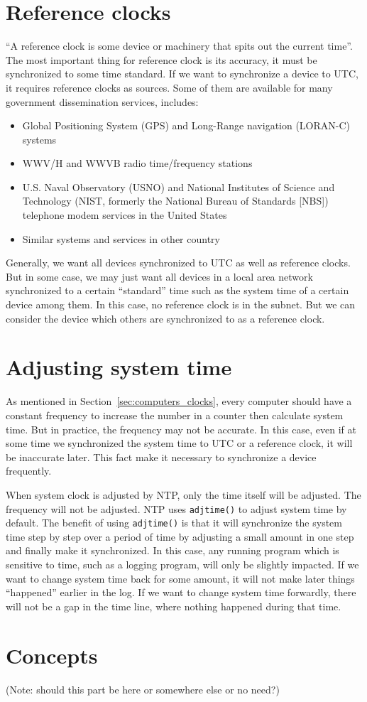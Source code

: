 \section{Reference clocks}%
\label{sec:reference_clocks}
``A reference clock is some device or machinery that spits out the current
time''. 
The most important thing for reference clock is its accuracy, it must be
synchronized to some time standard. If we want to synchronize a device to UTC,
it requires reference clocks as sources. Some of them are available for many
government dissemination services, includes:
\begin{itemize}
    \item Global Positioning System (GPS) and Long-Range navigation (LORAN-C)
        systems
    \item WWV/H and WWVB radio time/frequency stations
    \item U.S. Naval Observatory (USNO) and National Institutes of Science and
        Technology (NIST\null, formerly the National Bureau of Standards [NBS])
        telephone modem services in the United States
    \item Similar systems and services in other country
\end{itemize}
Generally, we want all devices synchronized to UTC as well as reference clocks.
But in some case, we may just want all devices in a local area network
synchronized to a certain ``standard'' time such as the system time of a
certain device among them. In this case, no reference clock is in the subnet.
But we can consider the device which others are synchronized to as a reference
clock. 

\section{Adjusting system time}%
\label{sec:adjusting_system_time}
As mentioned in Section~\ref{sec:computers_clocks}, every computer should have
a constant frequency to increase the number in a counter then calculate system
time. But in practice, the frequency may not be accurate. In this case, even if
at some time we synchronized the system time to UTC or a reference clock, it
will be inaccurate later. This fact make it necessary to synchronize a device
frequently.

When system clock is adjusted by NTP\null, only the time itself will be
adjusted.  The frequency will not be adjusted. NTP uses \verb|adjtime()| to
adjust system time by default. The benefit of using \verb|adjtime()| is that it
will synchronize the system time step by step over a period of time by
adjusting a small amount in one step and finally make it synchronized. In this
case, any running program which is sensitive to time, such as a logging
program, will only be slightly impacted. If we want to change system time back
for some amount, it will not make later things ``happened'' earlier in the log.
If we want to change system time forwardly, there will not be a gap in the time
line, where nothing happened during that time.

\section{Concepts}%
\label{sec:concepts}

(Note: should this part be here or somewhere else or no need?)


